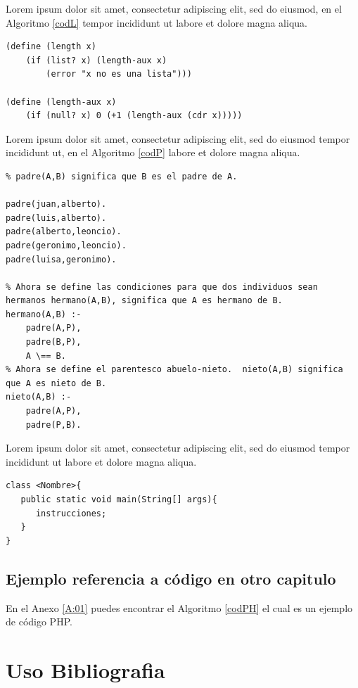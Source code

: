 \documentclass[letter,12pt]{report}
\begin{document}
Lorem ipsum dolor sit amet, consectetur adipiscing elit, sed do eiusmod, en el Algoritmo \ref{codL} tempor incididunt ut labore et dolore magna aliqua.

\lstset{language=LISP}
\begin{lstlisting}[caption= C\'odigo LISP de una Lista, label = codL]
(define (length x)
    (if (list? x) (length-aux x)
        (error "x no es una lista")))
        
(define (length-aux x)
    (if (null? x) 0 (+1 (length-aux (cdr x)))))
\end{lstlisting}

Lorem ipsum dolor sit amet, consectetur adipiscing elit, sed do eiusmod tempor incididunt ut, en el Algoritmo \ref{codP} labore et dolore magna aliqua.


\lstset{language=PROLOG}
\begin{lstlisting}[caption= C\'odigo PROLOG de un \'arbol geneal\'ogico, label=codP]
% Arbol genealogico version 1.
% padre(A,B) significa que B es el padre de A.

padre(juan,alberto).
padre(luis,alberto).
padre(alberto,leoncio). 
padre(geronimo,leoncio).
padre(luisa,geronimo). 

% Ahora se define las condiciones para que dos individuos sean hermanos hermano(A,B), significa que A es hermano de B.
hermano(A,B) :- 
    padre(A,P), 
    padre(B,P), 
    A \== B.
% Ahora se define el parentesco abuelo-nieto.  nieto(A,B) significa que A es nieto de B.
nieto(A,B) :- 
    padre(A,P), 
    padre(P,B). 
\end{lstlisting}

Lorem ipsum dolor sit amet, consectetur adipiscing elit, sed do eiusmod tempor incididunt ut labore et dolore magna aliqua.

   \lstset{language=java}
\begin{lstlisting}[caption= C\'odigo JAVA de una clase]
class <Nombre>{
   public static void main(String[] args){
      instrucciones;
   }
}
\end{lstlisting}

\subsection{Ejemplo referencia a código en otro capitulo}
En el Anexo \ref{A:01} puedes encontrar el Algoritmo \ref{codPH} el cual es un ejemplo de código PHP.



\section{Uso Bibliografia}
\end{document}

